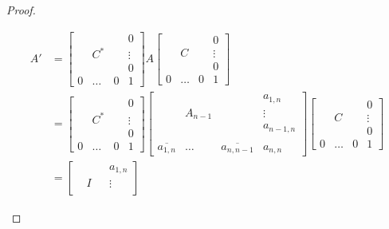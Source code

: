 \documentclass[a4paper]{article}
\numberwithin{lecref}{section}
\begin{document}
\begin{proof}
\begin{description}
\begin{description}
          \begin{align*}
            A' &= \begin{bmatrix}
                      &       &   & 0 \\
                      & C^*   &   & \vdots \\
                      &       &   & 0 \\
                    0 & \dots & 0 & 1
                  \end{bmatrix}
                  A
                  \begin{bmatrix}
                      &       &   & 0 \\
                      & C     &   & \vdots \\
                      &       &   & 0 \\
                    0 & \dots & 0 & 1
                  \end{bmatrix} \\
                  &= \begin{bmatrix}
                      &       &   & 0 \\
                      & C^*   &   & \vdots \\
                      &       &   & 0 \\
                    0 & \dots & 0 & 1
                  \end{bmatrix} \begin{bmatrix}
                      & & & a_{1, n} \\
                      & A_{n-1} & & \vdots \\
                      & & & a_{n-1,n} \\ \\
                    \overline{a_{1,n}} & \ldots & \overline{a_{n,n-1}} & a_{n,n}
                  \end{bmatrix} \begin{bmatrix}
                      &       &   & 0 \\
                      & C     &   & \vdots \\
                      &       &   & 0 \\
                    0 & \dots & 0 & 1
                  \end{bmatrix} \\
                  &= \begin{bmatrix}
                      & & & a_{1, n} \\
                      & I & & \vdots \\

\end{bmatrix}
\end{align*}
\end{description}
\end{description}
\end{proof}
\end{document}
